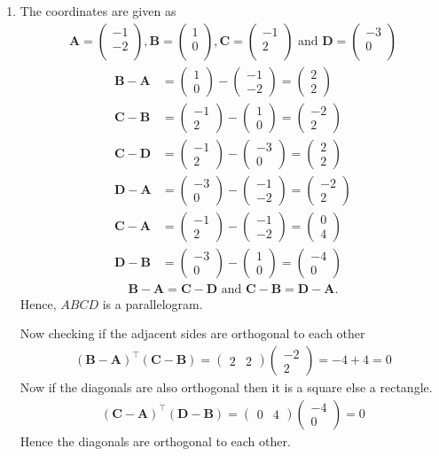 \documentclass[12pt]{article}
\newcommand{\myvec}[1]{\ensuremath{\begin{pmatrix}#1\end{pmatrix}}}
\let\vec\mathbf
\begin{document}
\begin{enumerate}
\item The coordinates are given as
	\begin{align}
	\vec{A} = \myvec{
		-1\\
		-2\\
		},
	\vec{B} = \myvec{
		1\\
		0\\
		},
	\vec{C} = \myvec{
		-1\\
		2\\
		} \text{ and }
	\vec{D} = \myvec{
		-3\\
		0\\
		}
	\end{align}
	\begin{align}
		\vec{B} - \vec{A} &= \myvec{1\\0} - \myvec{-1\\-2} = \myvec{2\\2}\\
		\vec{C} - \vec{B} &= \myvec{-1\\2} - \myvec{1\\0} = \myvec{-2\\2}\\
		\vec{C} - \vec{D} &= \myvec{-1\\2} - \myvec{-3\\0} = \myvec{2\\2}\\
		\vec{D} - \vec{A} &= \myvec{-3\\0} - \myvec{-1\\-2} = \myvec{-2\\2}\\
		\vec{C} - \vec{A} &= \myvec{-1\\2} - \myvec{-1\\-2} = \myvec{0\\4}\\
		\vec{D} - \vec{B} &= \myvec{-3\\0} - \myvec{1\\0} = \myvec{-4\\0}
	\end{align}
	\begin{align}	
		\vec{B}-\vec{A} = \vec{C}-\vec{D} \text{ and } \vec{C}-\vec{B} = \vec{D}-\vec{A}.
	\end{align}
	Hence, $ABCD$ is a parallelogram.

	Now checking if the adjacent sides are orthogonal to each other
	\begin{align}
		(\vec{B}-\vec{A})^\top (\vec{C}-\vec{B}) = \myvec{2&2} \myvec{-2\\2} = -4+4 = 0
	\end{align}
	Now if the diagonals are also orthogonal then it is a square else a rectangle.
	\begin{align}
		(\vec{C}-\vec{A})^\top (\vec{D}-\vec{B}) = \myvec{0&4} \myvec{-4\\0} = 0
	\end{align}
	Hence the diagonals are orthogonal to each other.


\end{enumerate}
\end{document}

